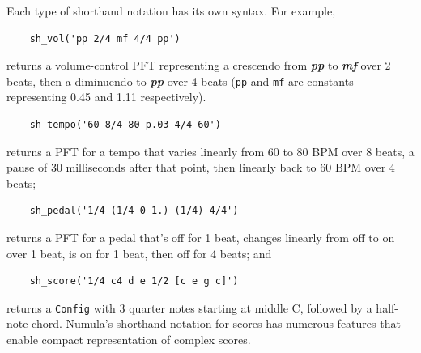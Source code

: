 \documentclass[letterpaper, 12pt]{article}
\begin{document}
Each type of shorthand notation has its own syntax.
For example,
\begin{small}\begin{singlespace}\vspace{-18px}\begin{verbatim}
    sh_vol('pp 2/4 mf 4/4 pp')
\end{verbatim}\end{singlespace}\end{small}\vspace{-18px}\noindent
returns a volume-control PFT representing a crescendo
from \textit{\textbf{pp}} to \textit{\textbf{mf}} over 2 beats,
then a diminuendo to \textit{\textbf{pp}} over 4 beats
(\texttt{pp} and \texttt{mf} are constants representing 0.45 and 1.11 respectively).
\begin{small}\begin{singlespace}\vspace{-18px}\begin{verbatim}
    sh_tempo('60 8/4 80 p.03 4/4 60')
\end{verbatim}\end{singlespace}\end{small}\vspace{-18px}\noindent
returns a PFT for a tempo that varies linearly from 60 to 80 BPM
over 8 beats,
a pause of 30 milliseconds after that point,
then linearly back to 60 BPM over 4 beats;
\begin{small}\begin{singlespace}\vspace{-18px}\begin{verbatim}
    sh_pedal('1/4 (1/4 0 1.) (1/4) 4/4')
\end{verbatim}\end{singlespace}\end{small}\vspace{-18px}\noindent
returns a PFT for a pedal that's off for 1 beat,
changes linearly from off to on over 1 beat,
is on for 1 beat, then off for 4 beats; and
\begin{small}\begin{singlespace}\vspace{-18px}\begin{verbatim}
    sh_score('1/4 c4 d e 1/2 [c e g c]')
\end{verbatim}\end{singlespace}\end{small}\vspace{-18px}\noindent
returns a \texttt{Config} with 3 quarter notes starting at middle C,
followed by a half-note chord.
Numula's shorthand notation for scores has numerous features
that enable compact representation of complex scores.
\end{document}
